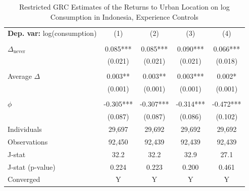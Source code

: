 \begin{table}[htbp] \centering \begin{threeparttable}
 \caption{Restricted GRC Estimates of the Returns to Urban Location on log Consumption in Indonesia, Experience Controls} 
 \label{tab:GRC_IDN_consumption_urban_unb_exp} 
\begin{tabular}{l cccc} \toprule  \textbf{Dep. var:}  log(consumption) 
                    &\multicolumn{1}{c}{(1)}   &\multicolumn{1}{c}{(2)}   &\multicolumn{1}{c}{(3)}   &\multicolumn{1}{c}{(4)}   \\
                    &               &               &               &               \\
\addlinespace
$\Delta_{\text{never}}$&       0.085***&       0.085***&       0.090***&       0.066***\\
                    &     (0.021)   &     (0.021)   &     (0.021)   &     (0.018)   \\
                    &               &               &               &               \\
\addlinespace
Average $\Delta$    &       0.003** &       0.003** &       0.003***&       0.002*  \\
                    &     (0.001)   &     (0.001)   &     (0.001)   &     (0.001)   \\
                    &               &               &               &               \\
\addlinespace
$\phi$              &      -0.305***&      -0.307***&      -0.314***&      -0.472***\\
                    &     (0.087)   &     (0.087)   &     (0.086)   &     (0.102)   \\
\addlinespace
Individuals         &      29,697   &      29,692   &      29,692   &      29,692   \\
Observations        &      92,450   &      92,439   &      92,439   &      92,439   \\
J-stat              &        32.2   &        32.2   &        32.9   &        27.1   \\
J-stat (p-value)    &       0.224   &       0.223   &       0.200   &       0.461   \\
Converged           &           Y   &           Y   &           Y   &           Y   \\

\end{tabular}
\end{threeparttable}
\end{table}
